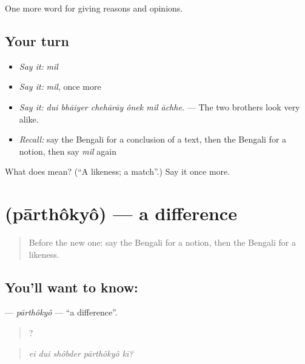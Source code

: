 \begin{grammarlens}[title={What you've built}]
One more word for giving reasons and opinions.
\end{grammarlens}

\subsection*{Your turn}
\begin{itemize}
\raggedright
  \item \emph{Say it:} \emph{mil}
  \item \emph{Say it:} \emph{mil}, once more
  \item \emph{Say it:} \emph{dui bhāiyer chehārāy ônek mil āchhe.} — The two brothers look very alike.
  \item \emph{Recall:} say the Bengali for a conclusion of a text, then the Bengali for a notion, then say \emph{mil} again
\end{itemize}

\begin{tcolorbox}[breakable,colback=teal!4,colframe=teal!35!black,title={Before you move on}]
What does  mean? (\textquotedblleft{}A likeness; a match\textquotedblright{}.) Say it once more.
\end{tcolorbox}
\section[\texorpdfstring{\bn{পার্থক্য} (pārthôkyô)}{পার্থক্য (pārthôkyô)}]{ (pārthôkyô) — a difference}

\label{lesson:BN-C358-parthokyo}



\begin{quote}
Before the new one: say the Bengali for a notion, then the Bengali for a likeness.
\end{quote}

\subsection*{You'll want to know: }
\textbf{} — \emph{pārthôkyô} — \textquotedblleft{}a difference\textquotedblright{}.

\begin{quote}
    ?
\end{quote}

\begin{quote}
\emph{ei dui shôbder pārthôkyô kī?}
\end{quote}

